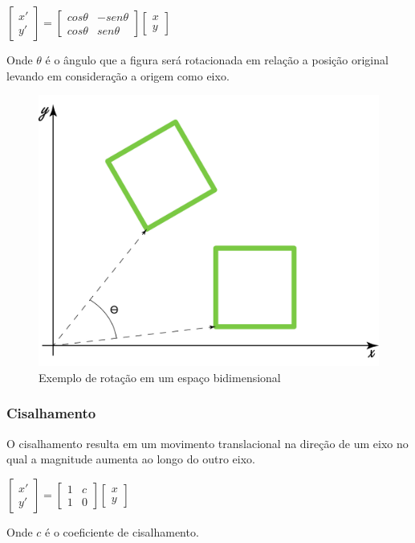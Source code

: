 \documentclass[9pt, a4paper, nofonttune, journal]{IEEEtran}
\begin{document}
\begin{center}
$\begin{bmatrix}x'\\
y'
\end{bmatrix}=\begin{bmatrix}cos\theta & -sen\theta\\
cos\theta & sen\theta
\end{bmatrix}\begin{bmatrix}x\\
y
\end{bmatrix}$\end{center}
Onde $\theta$ é o ângulo que a figura será rotacionada em relação a posição original levando em consideração a origem como eixo. \cite{CGPPBook1}

\begin{figure}[H] 
\begin{center}
\includegraphics[scale=0.25]{figuras/rotation1}
\caption{Exemplo de rotação em um espaço bidimensional}
\end{center}
\end{figure}

\subsubsection{Cisalhamento}
O cisalhamento resulta em um movimento translacional na direção de um eixo no qual a magnitude
aumenta ao longo do outro eixo.

\begin{center}
$\begin{bmatrix}x'\\
y'
\end{bmatrix}=\begin{bmatrix}1 & c\\
1 & 0
\end{bmatrix}\begin{bmatrix}x\\
y
\end{bmatrix}$\end{center}
Onde $c$ é o coeficiente de cisalhamento.\cite{CGPPBook1}
\end{document}
